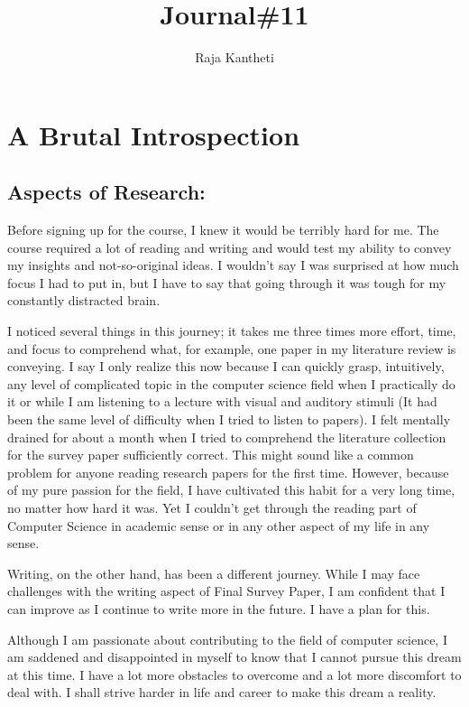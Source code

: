 \documentclass[10pt]{article}
\title{Journal\#11}
\author{Raja Kantheti}
\begin{document}
\maketitle
\section{A Brutal Introspection}
\subsection*{Aspects of Research:}
Before signing up for the course, I knew it would be terribly hard for me. The course required a lot of reading and writing and would test my ability to convey my insights and not-so-original ideas. I wouldn't say I was surprised at how much focus I had to put in, but I have to say that going through it was tough for my constantly distracted brain.

I noticed several things in this journey; it takes me three times more effort, time, and focus to comprehend what, for example, one paper in my literature review is conveying. I say I only realize this now because I can quickly grasp, intuitively, any level of complicated topic in the computer science field when I practically do it or while I am listening to a lecture with visual and auditory stimuli (It had been the same level of difficulty when I tried to listen to papers). I felt mentally drained for about a month when I tried to comprehend the literature collection for the survey paper sufficiently correct. This might sound like a common problem for anyone reading research papers for the first time. However, because of my pure passion for the field, I have cultivated this habit for a very long time, no matter how hard it was. Yet I couldn't get through the reading part of Computer Science in academic sense or in any other aspect of my life in any sense.

Writing, on the other hand, has been a different journey. While I may face challenges with the writing aspect of Final Survey Paper, I am confident that I can improve as I continue to write more in the future. I have a plan for this.

Although I am passionate about contributing to the field of computer science, I am saddened and disappointed in myself to know that I cannot pursue this dream at this time. I have a lot more obstacles to overcome and a lot more discomfort to deal with. I shall strive harder in life and career to make this dream a reality.
\end{document}
